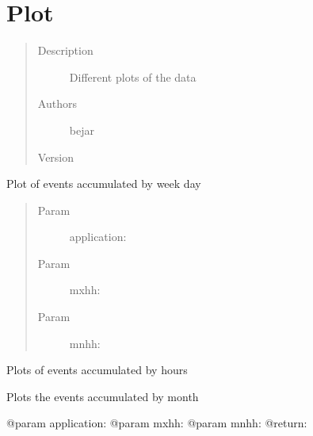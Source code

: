 \documentclass[letterpaper,10pt,english]{sphinxmanual}
\begin{document}
\section{Plot}
\label{index:plot}\begin{quote}\begin{description}
\item[{Description}] \leavevmode
Different plots of the data

\item[{Authors}] \leavevmode
bejar

\item[{Version}] 

\end{description}\end{quote}

\begin{fulllineitems}
\label{index:SuperHub.Plots.daily_histogram}
Plot of events accumulated by week day
\begin{quote}\begin{description}
\item[{Param }] \leavevmode
application:

\item[{Param }] \leavevmode
mxhh:

\item[{Param }] \leavevmode
mnhh:

\end{description}\end{quote}

\end{fulllineitems}


\begin{fulllineitems}
\label{index:SuperHub.Plots.hourly_histogram}
Plots of events accumulated by hours

\end{fulllineitems}


\begin{fulllineitems}
\label{index:SuperHub.Plots.montly_histogram}
Plots the events accumulated by month

@param application:
@param mxhh:
@param mnhh:
@return:

\end{fulllineitems}
\end{document}

